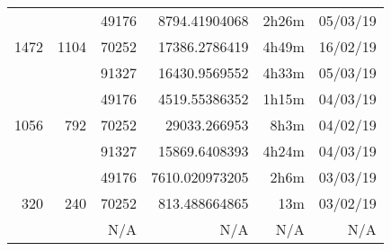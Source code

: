\begin{center}
\begin{tabular}{ r r r | r r r }
  \hline
  \multirow{3}{*}{1472} & \multirow{3}{*}{1104} & 49176 & 8794.41904068 & 2h26m & 05/03/19 \\
  & & 70252 & 17386.2786419 & 4h49m & 16/02/19 \\
  & & 91327 & 16430.9569552 & 4h33m & 05/03/19 \\
  \hline
  \multirow{3}{*}{1056} & \multirow{3}{*}{792} & 49176 & 4519.55386352 & 1h15m & 04/03/19 \\
  & & 70252 & 29033.266953 & 8h3m & 04/02/19 \\
  & & 91327 & 15869.6408393 & 4h24m & 04/03/19 \\
  \hline
  \multirow{3}{*}{320} & \multirow{3}{*}{240} & 49176 & 7610.020973205 & 2h6m & 03/03/19 \\
  & & 70252 & 813.488664865 & 13m & 03/02/19 \\
  & & N/A & N/A & N/A & N/A \\
  \end{tabular}
  \end{center}
  
\newpage
